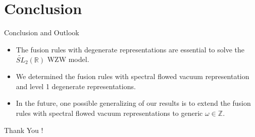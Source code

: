\documentclass{beamer}
\begin{document}
\section{Conclusion}

\begin{frame}{Conclusion and Outlook}
  \begin{itemize}
    \item The fusion rules with degenerate representations are essential to solve the $\widetilde{SL}_{2}(\mathbb{R})$ WZW model. 
    \item We determined the fusion rules with spectral flowed vacuum representation and level 1 degenerate representations. 
    \item In the future, one possible generalizing of our results is to extend the fusion rules with spectral flowed vacuum representations 
          to generic $\omega \in \mathbb{Z}$. 
  \end{itemize}
\end{frame}


\begin{frame}[plain]
  \vfill
  \begin{center}
    \Huge Thank You !
  \end{center}
  \vfill
\end{frame}
\end{document}
